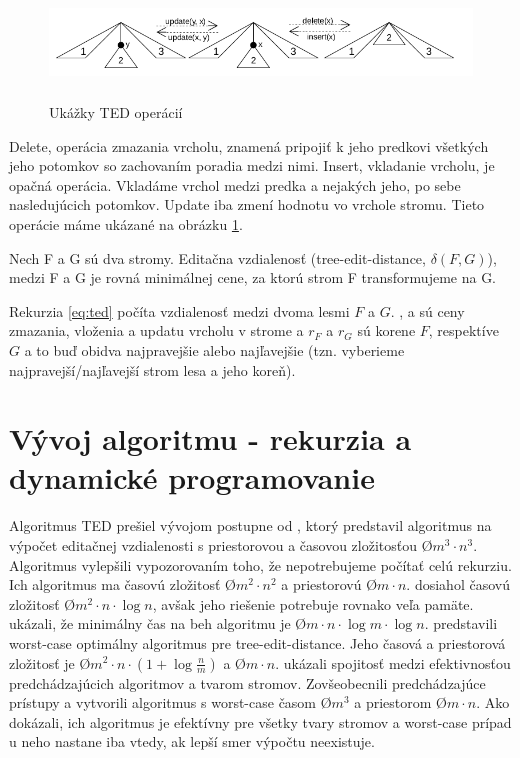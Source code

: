 \begin{figure}[H]
\centering
\includegraphics[width=140mm, height=30mm]{../img/TED_operations.png}
\caption{Ukážky TED operácií}
\label{obr:TED_operations}
\end{figure}

Delete, operácia zmazania vrcholu, znamená pripojiť k jeho predkovi všetkých jeho
potomkov so zachovaním poradia medzi nimi. Insert, vkladanie vrcholu, je opačná
operácia. Vkladáme vrchol medzi predka a nejakých jeho, po sebe nasledujúcich
potomkov. Update iba zmení hodnotu vo vrchole stromu.
Tieto operácie máme ukázané na obrázku \ref{obr:TED_operations}.

\begin{definice}
  Nech F a G sú dva stromy. Editačna vzdialenosť (tree-edit-distance, $\delta(F, G)$),
	medzi F a G je rovná minimálnej cene, za ktorú strom F transformujeme na G.
\end{definice}

Rekurzia \ref{eq:ted} počíta vzdialenosť medzi dvoma lesmi $F$ a $G$.
\Cdel, \Cins a \Cupd sú ceny zmazania, vloženia a updatu vrcholu v strome
a $r_{F}$ a $r_{G}$ sú korene $F$, respektíve $G$ a to buď obidva najpravejšie
alebo najľavejšie (tzn. vyberieme najpravejší/najľavejší strom lesa a jeho koreň).



\section{\sloppy Vývoj algoritmu - rekurzia a dynamické programovanie}

Algoritmus TED prešiel vývojom postupne od \citet{TAI}, ktorý predstavil algoritmus
na výpočet editačnej vzdialenosti s priestorovou a časovou zložitosťou
\O{$m^3 \cdot n^3$}. Algoritmus vylepšili \citet{ZHANGSHASHA} vypozorovaním toho,
že nepotrebujeme počítať celú rekurziu. Ich algoritmus ma časovú zložitosť \O{$m^2 \cdot n^2$}
a priestorovú \O{$m \cdot n$}. \citet{KLEIN} dosiahol časovú zložitosť \O{$m^2 \cdot n \cdot \log{n}$},
avšak jeho riešenie potrebuje rovnako veľa pamäte.
\citet{DALUCQ} ukázali, že minimálny čas na beh algoritmu je \O{$m \cdot n \cdot \log{m} \cdot \log{n}$}.
\citet{DMRW} predstavili worst-case optimálny algoritmus pre tree-edit-distance.
Jeho časová a priestorová zložitosť je \O{$m^2 \cdot n \cdot (1 + \log{\frac{n}{m}})$} a
\O{$m \cdot n$}. \citet{RTED} ukázali spojitosť medzi efektivnosťou predchádzajúcich algoritmov
a tvarom stromov. Zovšeobecnili predchádzajúce prístupy a vytvorili algoritmus
s worst-case časom \O{$m^3$} a priestorom \O{$m \cdot n$}.
Ako dokázali, ich algoritmus je efektívny pre všetky tvary stromov a worst-case
prípad u neho nastane iba vtedy, ak lepší smer výpočtu neexistuje.


